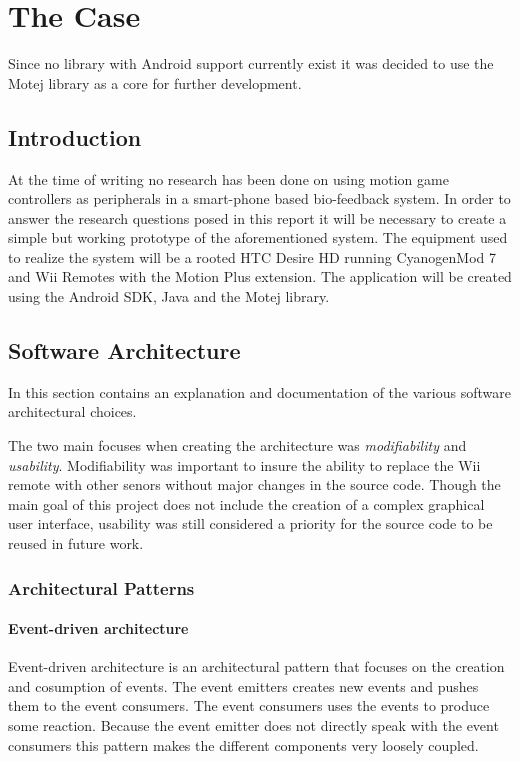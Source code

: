 \chapter{The Case}
Since no library with Android support currently exist it was decided to use the Motej library as a core for further development.

\section{Introduction}
At the time of writing no research has been done on using motion game controllers as peripherals in a smart-phone based bio-feedback system. In order to answer the research questions posed in this report it will be necessary to create a simple but working prototype of the aforementioned system. The equipment used to realize the system will be a rooted HTC Desire HD \cite{desireHdSpecs} running CyanogenMod 7 and Wii Remotes with the Motion Plus extension. The application will be created using the Android SDK, Java and the Motej library.



\section{Software Architecture}
In this section contains an explanation and documentation of the various software architectural choices.

The two main focuses when creating the architecture was \emph{modifiability} and \emph{usability}. Modifiability was important to insure the ability to replace the Wii remote with other senors without major changes in the source code. Though the main goal of this project does not include the creation of a complex graphical user interface, usability was still considered a priority for the source code to be reused in future work. 

\subsection{Architectural Patterns}
\subsubsection{Event-driven architecture}
Event-driven architecture is an architectural pattern that focuses on the creation and cosumption of events. The event emitters creates new events and pushes them to the event consumers. The event consumers uses the events to produce some reaction. Because the event emitter does not directly speak with the event consumers this pattern makes the different components very loosely coupled.

